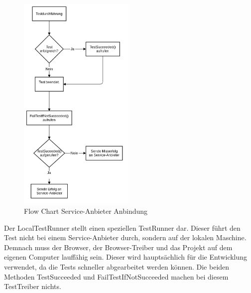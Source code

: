 \begin{figure}[H]
	\centering
	\includegraphics[width=0.5\textwidth]{images/Semesteararbeit flow chart - service anbieter.png}
	\caption{Flow Chart Service-Anbieter Anbindung}
	\label{fig:umsetzung:architektur:testrunners:serviceanbieter}
\end{figure}

Der LocalTestRunner stellt einen speziellen TestRunner dar. Dieser führt den Test nicht bei einem Service-Anbieter durch, sondern auf der lokalen Maschine. Demnach muss der Browser, der Browser-Treiber und das Projekt auf dem eigenen Computer lauffähig sein. Dieser wird hauptsächlich für die Entwicklung verwendet, da die Tests schneller abgearbeitet werden können. Die beiden Methoden TestSucceeded und FailTestIfNotSucceeded machen bei diesem TestTreiber nichts.

